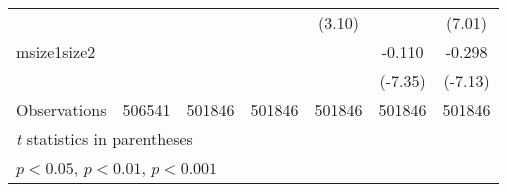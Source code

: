 {\begin{tabular}{l*{6}{c}}
                    &                     &                     &                     &      (3.10)         &                     &      (7.01)         \\
[1em]
msize1size2         &                     &                     &                     &                     &      -0.110\sym{***}&      -0.298\sym{***}\\
                    &                     &                     &                     &                     &     (-7.35)         &     (-7.13)         \\
\hline
Observations        &      506541         &      501846         &      501846         &      501846         &      501846         &      501846         \\
\hline\hline
\multicolumn{7}{l}{\footnotesize \textit{t} statistics in parentheses}\\
\multicolumn{7}{l}{\footnotesize \sym{*} \(p<0.05\), \sym{**} \(p<0.01\), \sym{***} \(p<0.001\)}\\
\end{tabular}
}
